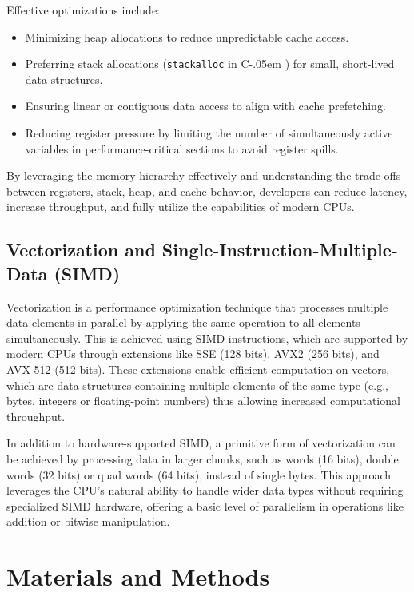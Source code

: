 \documentclass{article}
\newcommand{\Csharp}{%
  {\settoheight{\dimen0}{C}C\kern-.05em \resizebox{!}{\dimen0}{\raisebox{\depth}{\# }}}}
\begin{document}
Effective optimizations include:
\begin{itemize}
    \item Minimizing heap allocations to reduce unpredictable cache access.
    \item Preferring stack allocations (\texttt{stackalloc} in \Csharp) for small, short-lived data structures.
    \item Ensuring linear or contiguous data access to align with cache prefetching.
    \item Reducing register pressure by limiting the number of simultaneously active variables in performance-critical sections to avoid register spills.
\end{itemize}

By leveraging the memory hierarchy effectively and understanding the trade-offs between registers, stack, heap, and cache behavior, developers can reduce latency, increase throughput, and fully utilize the capabilities of modern CPUs.

\subsection{Vectorization and Single-Instruction-Multiple-Data (SIMD)}

Vectorization is a performance optimization technique that processes multiple data elements in parallel by applying the same operation to all elements simultaneously. This is achieved using SIMD-instructions, which are supported by modern CPUs through extensions like SSE (128 bits), AVX2 (256 bits), and AVX-512 (512 bits). These extensions enable efficient computation on vectors, which are data structures containing multiple elements of the same type (e.g., bytes, integers or floating-point numbers) thus allowing increased computational throughput.

In addition to hardware-supported SIMD, a primitive form of vectorization can be achieved by processing data in larger chunks, such as words (16 bits), double words (32 bits) or quad words (64 bits), instead of single bytes. This approach leverages the CPU’s natural ability to handle wider data types without requiring specialized SIMD hardware, offering a basic level of parallelism in operations like addition or bitwise manipulation.

\section{Materials and Methods}
\end{document}
